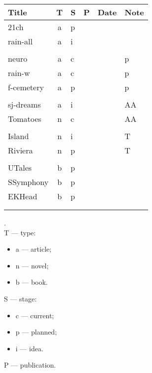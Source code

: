 \documentclass[a4paper,12pt]{article} %
\begin{document}
	
\begin{tabularx}{\textwidth}{|l|c|l|l|c|X|}
	\hline
	Title & T & S & P & Date & Note \\
	\hline
	21ch & a & p &  &  &  \\
	\hline
	rain-all & a & i &  &  &  \\
	\hline
	&  &  &  &  &  \\
	\hline
	neuro & a & c &  &  & p \\
	\hline
	rain-w & a & c &  &  & p \\
	\hline
	f-cemetery & a & p &  &  & p \\
	\hline
	&  &  &  &  &  \\
	\hline
	sj-dreams & a & i &  &  & AA \\
	\hline
	Tomatoes & n & c &  &  & AA \\
	\hline
	&  &  &  &  &  \\
	\hline
	Island & n & i &  &  & T \\
	\hline
	Riviera & n & p &  &  & T \\
	\hline
	&  &  &  &  &  \\
	\hline
	UTales & b & p &  &  &  \\
	\hline
	SSymphony & b & p &  &  &  \\
	\hline
	EKHead & b & p &  &  &  \\
	\hline
	&  &  &  &  &  \\
	\hline
	&  &  &  &  &  \\
	\hline
\end{tabularx}

.\\

T --- type:
\begin{itemize}
	\item a --- article;
	\item n --- novel;
	\item b --- book.\\
\end{itemize}

S --- stage:
\begin{itemize}
	\item c --- current;
	\item p --- planned;
	\item i --- idea.\\
\end{itemize}

P --- publication.

\end{document}

